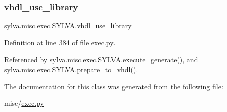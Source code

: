 \subsubsection{\texorpdfstring{vhdl\+\_\+use\+\_\+library}{vhdl\_use\_library}}
{\footnotesize\ttfamily sylva.\+misc.\+exec.\+S\+Y\+L\+V\+A.\+vhdl\+\_\+use\+\_\+library}



Definition at line 384 of file exec.\+py.



Referenced by sylva.\+misc.\+exec.\+S\+Y\+L\+V\+A.\+execute\+\_\+generate(), and sylva.\+misc.\+exec.\+S\+Y\+L\+V\+A.\+prepare\+\_\+to\+\_\+vhdl().



The documentation for this class was generated from the following file\+:\begin{DoxyCompactItemize}
\item 
misc/\hyperlink{exec_8py}{exec.\+py}\end{DoxyCompactItemize}
